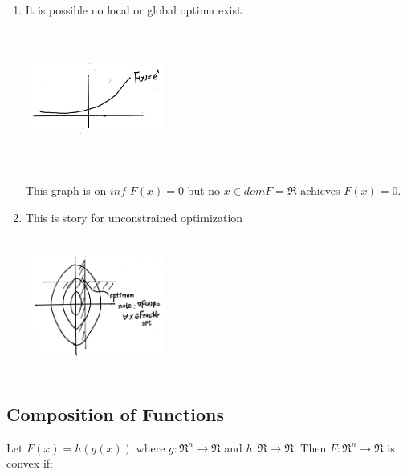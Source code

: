 \begin{enumerate}
	\item It is possible no local or global optima exist.
	
	\begin{marginfigure}
	\centering
	\includegraphics[width=1.8in,height=1.8in]{figures/ch08/figure1111_2.png}
	\end{marginfigure}
	
	This graph is on $inf\,\, F(x) = 0$ but no $x\in domF = \Re$ achieves $F(x) = 0$.
	
	\item This is story for unconstrained optimization
	
	\begin{marginfigure}
	\centering
	\includegraphics[width=1.8in,height=1.8in]{figures/ch08/figure1111_3.png}
	\end{marginfigure}
	
\end{enumerate}










\subsection{Composition of Functions}

Let $F(x) = h(g(x))$ where $g: \Re^n \rightarrow \Re$ and $h: \Re\rightarrow \Re$. Then $F: \Re^n\rightarrow \Re$ is convex if:



